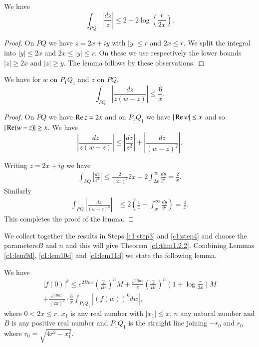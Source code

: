 \begin{lem}\label{c1:lem10d}
We have
\begin{equation*}
\int_{PQ} |\frac{dz}{z}| \leq 2 + 2 \log \left(\frac{r}{2x} \right). \tag{1.7.24}\label{c1:eq1.7.24}
\end{equation*}
\end{lem}

\begin{proof}
On $PQ$ we have $z = 2 x + iy$ with $|y| \leq r$ and $2x \leq r$. We split the integral into $|y| \leq 2x$ and $2x \leq |y| \leq r$. On these we use respectively the lower bounds $|z| \geq 2x$ and $|z| \geq y$. The lemma follows by these observations.
\end{proof}

\begin{lem}\label{c1:lem11d}
We have for $w$ on $P_1Q_1$ and $z$ on $PQ$,
\begin{equation*}
\int_{PQ}| \frac{dz}{z(w-z)}| \leq \frac{6}{x} . \tag{1.7.25}\label{c1:eq1.7.25}
\end{equation*}
\end{lem}

\begin{proof}
On $PQ$ we have $\operatorname{Re} z = 2x$ and on $P_1 Q_1$ we have $|\operatorname{Re} w | \leq x$ and so $|\operatorname{Re} (w -z)| \geq x$. We have
$$
|\frac{dz}{z(w -z)}| \leq | \frac{dz}{z^2} | + |\frac{dz}{(w-z)^2}|. 
$$

Writing $z = 2x + iy$ we have
\begin{align*}
\int_{PQ} |\frac{dz}{z^2}|  \leq \frac{2}{(2x)^2} 2x + 2 \int^\infty_{2x} \frac{dy}{y^2} = 
 \frac{2}{x}. 
\end{align*}
Similarly
\begin{align*}
\int_{PQ} |\frac{dz}{(w-z)^2}| & \leq 2 \left(\frac{1}{x} + \int^{\infty}_x \frac{dy}{y^2} \right) = \frac{4}{x}. 
\end{align*}
This completes the proof of the lemma.
\end{proof}

\begin{step}\label{c1:step4}
We collect together the results in Steps \ref{c1:step3} and \ref{c1:step4} and choose the parameters\pageoriginale $B$ and $n$ and this will give Theorem \ref{c1:thm1.2.2}. Combining Lemmas \ref{c1:lem9d}, \ref{c1:lem10d} and \ref{c1:lem11d} we state the following lemma.
\end{step}

\begin{lem}\label{c1:lem12d}
We have
\begin{gather*}
|f(0)|^k \leq e^{2Bnx} \left(\frac{2}{Br} \right)^n M + \frac{e^{5Bnx}}{\pi} \left(\frac{2}{Br} \right)^n \left( 1+ \log \frac{r}{2x} \right) M\\
+ \frac{e^{5Bnx}}{(2\pi)^2} \cdot \frac{6}{x} \int_{P_1 Q_1} |(f(w))^k dw|, \tag{1.7.26} \label{c1:eq1.7.26}
 \end{gather*}
where $0 < 2x \leq r$, $x_1$ is any real number with $|x_1| \leq x$, $n$ any natural number and $B$ is any positive real number and $P_1 Q_1$ is the straight line joining $-r_0$ and $r_0$ where $r_0 = \sqrt{4r^2 - x^2_1}$. 
\end{lem}

